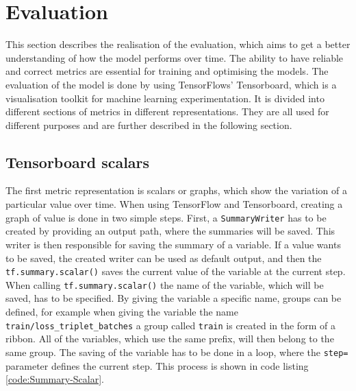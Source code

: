 \section{Evaluation}
\label{sec:Realisation-Evaluation}
This section describes the realisation of the evaluation, which aims to get a better understanding of how the model performs over time. The ability to have reliable and correct metrics are essential for training and optimising the models. The evaluation of the model is done by using TensorFlows' Tensorboard\footnotemark, which is a visualisation toolkit for machine learning experimentation. It is divided into different sections of metrics in different representations. They are all used for different purposes and are further described in the following section.

\subsection{Tensorboard scalars}
\label{sub:Tensorboard-Scalars}
The first metric representation is scalars or graphs, which show the variation of a particular value over time. When using TensorFlow and Tensorboard, creating a graph of value is done in two simple steps. First, a \texttt{SummaryWriter} has to be created by providing an output path, where the summaries will be saved. This writer is then responsible for saving the summary of a variable. If a value wants to be saved, the created writer can be used as default output, and then the  \texttt{tf.summary.scalar()} saves the current value of the variable at the current step. When calling \texttt{tf.summary.scalar()} the name of the variable, which will be saved, has to be specified. By giving the variable a specific name, groups can be defined, for example when giving the variable the name \texttt{train/loss\_triplet\_batches} a group called \texttt{train} is created in the form of a ribbon. All of the variables, which use the same prefix, will then belong to the same group. The saving of the variable has to be done in a loop, where the \texttt{step=} parameter defines the current step. This process is shown in code listing \ref{code:Summary-Scalar}.

